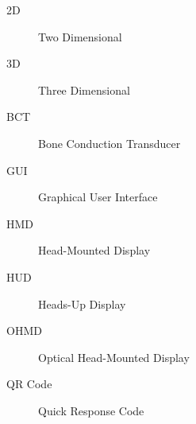 \begin{description}
	\item [2D] Two Dimensional
	\item [3D] Three Dimensional
	\item [BCT] Bone Conduction Transducer
	\item [GUI] Graphical User Interface
	\item [HMD] Head-Mounted Display
	\item [HUD] Heads-Up Display
	\item [OHMD] Optical Head-Mounted Display
	\item [QR Code] Quick Response Code
\end{description}